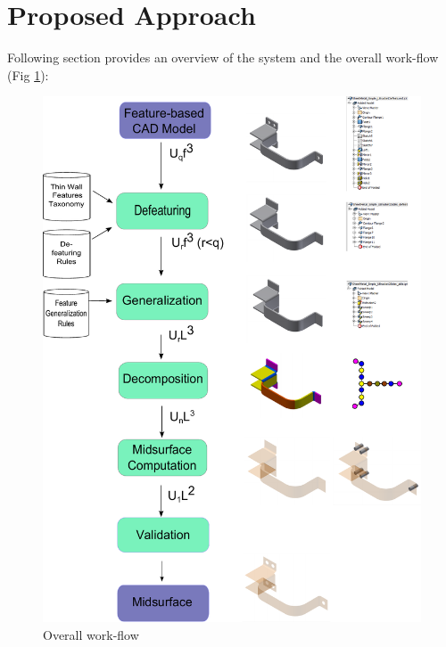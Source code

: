 \newcommand{\loft}[5]{\ensuremath{\textcolor{magenta}{\Omega{\bf \mathcal{L}}_{#1}^{#2,#3}}[\textcolor{blue}{\{#4\}}\textcolor{red}{(#5)}]}}

\newcommand{\affine}[5]{\ensuremath{\textcolor{magenta}{\Delta{\bf \mathcal{A}}_{#1}^{#2,#3}} [\textcolor{blue}{\{#4\}} \textcolor{red}{(#5)}]}}

\newcommand{\boolop}[5]{\ensuremath{\textcolor{magenta}{\Omega{\bf \mathcal{B}}_{#1}^{#2,#3}}[\textcolor{blue}{\{#4\}} \textcolor{red}{(#5)}]}}

\newcommand{\generic}[7]{\ensuremath{\textcolor{magenta}{#1{\bf \mathcal{#2}}_{#3}^{#4,#5}}[\textcolor{blue}{\{#6\}} \textcolor{red}{(#7)}]}}
\newtheorem{mydef}{Definition}
\newtheorem{mylem}{Remark}

\section{Proposed Approach}
\label{sec:approach}
Following section provides an overview of the system and the overall work-flow (Fig  \ref{fig_sysarch}):

    \begin{figure}[!htp]
	\centering 
	\includegraphics[width=0.65\linewidth]{../Common/images/SystemArchitecture3.pdf}
	\caption{Overall work-flow}
	\label{fig_sysarch}
    \end{figure}

